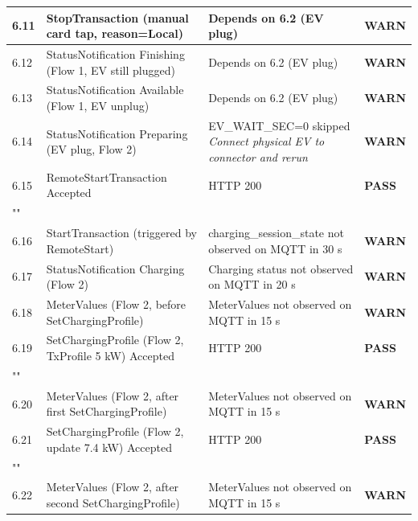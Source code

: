 \documentclass[10pt, a4paper]{article}
\begin{document}
\begin{longtable}{|L{1cm}|L{5.5cm}|M{7cm}|C{1.8cm}|}
\hline
\small 6.11 & \small StopTransaction (manual card tap, reason=Local) & Depends on 6.2 (EV plug) & \textcolor{warnorange}{\textbf{WARN}} \\
\hline
\small 6.12 & \small StatusNotification Finishing (Flow 1, EV still plugged) & Depends on 6.2 (EV plug) & \textcolor{warnorange}{\textbf{WARN}} \\
\hline
\small 6.13 & \small StatusNotification Available (Flow 1, EV unplug) & Depends on 6.2 (EV plug) & \textcolor{warnorange}{\textbf{WARN}} \\
\hline
\small 6.14 & \small StatusNotification Preparing (EV plug, Flow 2) & EV\_WAIT\_SEC=0  skipped{\newline\normalfont\footnotesize\itshape Connect physical EV to connector and rerun} & \textcolor{warnorange}{\textbf{WARN}} \\
\hline
\small 6.15 & \small RemoteStartTransaction  Accepted & HTTP 200 & \textcolor{passgreen}{\textbf{PASS}} \\
\hline
{} \\
\hline
\small 6.16 & \small StartTransaction (triggered by RemoteStart) & charging\_session\_state not observed on MQTT in 30 s & \textcolor{warnorange}{\textbf{WARN}} \\
\hline
\small 6.17 & \small StatusNotification Charging (Flow 2) & Charging status not observed on MQTT in 20 s & \textcolor{warnorange}{\textbf{WARN}} \\
\hline
\small 6.18 & \small MeterValues (Flow 2, before SetChargingProfile) & MeterValues not observed on MQTT in 15 s & \textcolor{warnorange}{\textbf{WARN}} \\
\hline
\small 6.19 & \small SetChargingProfile (Flow 2, TxProfile 5 kW)  Accepted & HTTP 200 & \textcolor{passgreen}{\textbf{PASS}} \\
\hline
{} \\
\hline
\small 6.20 & \small MeterValues (Flow 2, after first SetChargingProfile) & MeterValues not observed on MQTT in 15 s & \textcolor{warnorange}{\textbf{WARN}} \\
\hline
\small 6.21 & \small SetChargingProfile (Flow 2, update 7.4 kW)  Accepted & HTTP 200 & \textcolor{passgreen}{\textbf{PASS}} \\
\hline
{} \\
\hline
\small 6.22 & \small MeterValues (Flow 2, after second SetChargingProfile) & MeterValues not observed on MQTT in 15 s & \textcolor{warnorange}{\textbf{WARN}} \\

\end{longtable}
\end{document}
